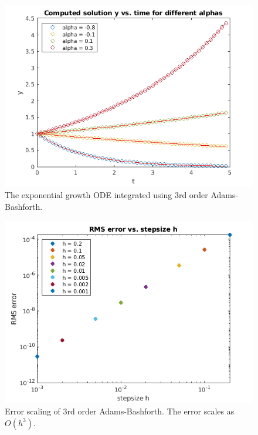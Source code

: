 \documentclass[hidelinks,notitlepage]{book}
\begin{document}
\begin{figure}[tbh]
	\centering
	\includegraphics[width=0.7\columnwidth]{AdamsBashforth3Exponential.png}
	\caption{The exponential growth ODE integrated using 3rd order Adams-Bashforth.}
	\label{fig:AdamsBashforth3Exponential}
\end{figure}
\begin{figure}[tbh]
	\centering
	\includegraphics[width=0.7\columnwidth]{AdamsBashforth3ExponentialErr.png}
	\caption{Error scaling of 3rd order Adams-Bashforth.  The error scales as $O(h^3)$.}
	\label{fig:AdamsBashforth3ExponentialErr}
\end{figure}
\end{document}
